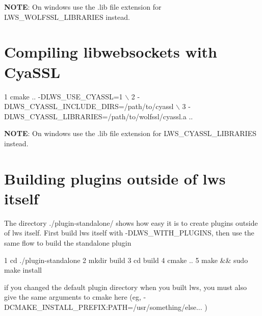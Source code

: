 {\bfseries N\+O\+TE}\+: On windows use the .lib file extension for {\ttfamily L\+W\+S\+\_\+\+W\+O\+L\+F\+S\+S\+L\+\_\+\+L\+I\+B\+R\+A\+R\+I\+ES} instead.\hypertarget{md_README.build_cya}{}\section{Compiling libwebsockets with Cya\+S\+SL}\label{md_README.build_cya}

\begin{DoxyCode}
1 cmake .. -DLWS\_USE\_CYASSL=1 \(\backslash\)
2          -DLWS\_CYASSL\_INCLUDE\_DIRS=/path/to/cyassl \(\backslash\)
3          -DLWS\_CYASSL\_LIBRARIES=/path/to/wolfssl/cyassl.a ..
\end{DoxyCode}


{\bfseries N\+O\+TE}\+: On windows use the .lib file extension for {\ttfamily L\+W\+S\+\_\+\+C\+Y\+A\+S\+S\+L\+\_\+\+L\+I\+B\+R\+A\+R\+I\+ES} instead.\hypertarget{md_README.build_extplugins}{}\section{Building plugins outside of lws itself}\label{md_README.build_extplugins}
The directory ./plugin-\/standalone/ shows how easy it is to create plugins outside of lws itself. First build lws itself with -\/\+D\+L\+W\+S\+\_\+\+W\+I\+T\+H\+\_\+\+P\+L\+U\+G\+I\+NS, then use the same flow to build the standalone plugin 
\begin{DoxyCode}
1 cd ./plugin-standalone
2 mkdir build
3 cd build
4 cmake ..
5 make && sudo make install
\end{DoxyCode}


if you changed the default plugin directory when you built lws, you must also give the same arguments to cmake here (eg, {\ttfamily -\/\+D\+C\+M\+A\+K\+E\+\_\+\+I\+N\+S\+T\+A\+L\+L\+\_\+\+P\+R\+E\+F\+IX\+:P\+A\+TH=/usr/something/else...} )

